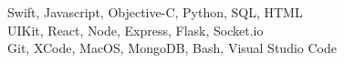    Swift, Javascript, Objective-C, Python, SQL, HTML \\
   UIKit, React, Node, Express, Flask, Socket.io\\
  Git, XCode, MacOS, MongoDB, Bash, Visual Studio Code
